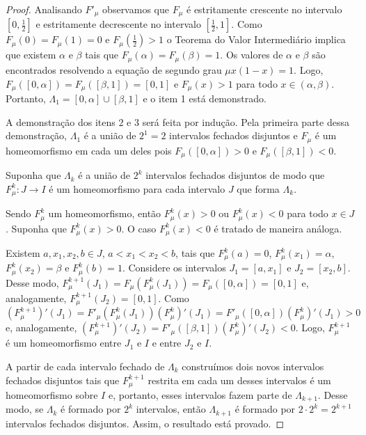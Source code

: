 \documentclass[a4paper, 12pt]{article}
\theoremstyle{definition}
\theoremstyle{plain}
\theoremstyle{plain}
\theoremstyle{plain}
\theoremstyle{remark}
\begin{document}
\begin{proof}
Analisando $F'_\mu$ observamos que $F_\mu$ é estritamente crescente no intervalo $[0, \frac{1}{2}]$ e estritamente decrescente no intervalo $[\frac{1}{2}, 1]$. Como $F_\mu (0) = F_\mu (1) = 0$ e $F_\mu (\frac{1}{2}) > 1$ o Teorema do Valor Intermediário implica que existem $\alpha$ e $\beta$ tais que $F_\mu (\alpha) = F_\mu (\beta) = 1$. Os valores de $\alpha$ e $\beta$ são encontrados resolvendo a equação de segundo grau $\mu x(1-x) = 1$. Logo, $F_\mu ([0, \alpha]) = F_\mu ([\beta, 1]) = [0, 1]$ e $F_\mu(x) > 1$ para todo $x \in (\alpha, \beta)$. Portanto, $\Lambda_1 = [0, \alpha] \cup [\beta, 1]$ e o item 1 está demonstrado.

A demonstração dos itens $2$ e $3$ será feita por indução. Pela primeira parte dessa demonstração, $\Lambda_1$ é a união de $2^1 = 2$ intervalos fechados disjuntos e $F_\mu$ é um homeomorfismo em cada um deles pois $F_\mu([0, \alpha]) > 0$ e $F_\mu([\beta, 1]) < 0$.

Suponha que $\Lambda_k$ é a união de $2^k$ intervalos fechados disjuntos de modo que $F^k_\mu: J \rightarrow I$ é um homeomorfismo para cada intervalo $J$ que forma $\Lambda_k$.

Sendo $F^k_\mu$ um homeomorfismo, então $F^k_\mu (x) > 0$ ou $F^k_\mu (x) < 0$ para todo $x \in J$. Suponha que $F^k_\mu (x) > 0$. O caso $F^k_\mu (x) < 0$ é tratado de maneira análoga.

Existem $a, x_1, x_2, b \in J$, $a < x_1 < x_2 < b$, tais que $F^k_\mu (a) = 0$, $F^k_\mu (x_1) = \alpha$, $F^k_\mu (x_2) =\beta$ e $F^k_\mu (b) = 1$. Considere os intervalos $J_1 = [a, x_1]$ e $J_2 = [x_2,b]$. Desse modo, $F^{k+1}_\mu (J_1) = F_\mu(F^k_\mu (J_1)) = F_\mu([0, \alpha]) = [0, 1]$ e, analogamente, $F^{k+1}_\mu (J_2) = [0, 1]$. Como $(F^{k+1}_\mu)' (J_1) = F'_\mu(F^k_\mu (J_1))(F^k_\mu)' (J_1) = F'_\mu([0, \alpha])(F^k_\mu)' (J_1) > 0$ e, analogamente, $(F^{k+1}_\mu)' (J_2) = F'_\mu([\beta, 1])(F^k_\mu)' (J_2) < 0$. Logo, $F^{k+1}_\mu$ é um homeomorfismo entre $J_1$ e $I$ e entre $J_2$ e $I$.

A partir de cada intervalo fechado de $\Lambda_k$ construímos dois novos intervalos fechados disjuntos tais que $F^{k+1}_\mu$ restrita em cada um desses intervalos é um homeomorfismo sobre $I$ e, portanto, esses intervalos fazem parte de $\Lambda_{k+1}$. Desse modo, se $\Lambda_k$ é formado por $2^k$ intervalos, então $\Lambda_{k+1}$ é formado por $2\cdot2^k = 2^{k+1}$ intervalos fechados disjuntos. Assim, o resultado está provado.
\end{proof}
\end{document}
